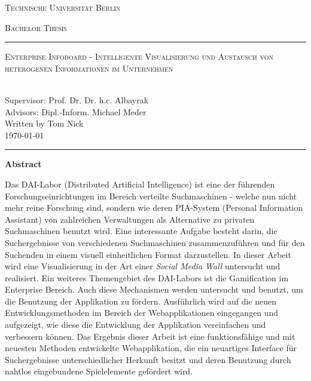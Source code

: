 \documentclass[12pt,twoside]{book}
\renewcommand{\title}{Enterprise Infoboard - Intelligente Visualisierung und Austausch von heterogenen Informationen im Unternehmen}
\renewcommand{\author}{Tom Nick}
\begin{document}
\begin{titlepage}
\begin{center}
{\Huge \textsc{Technische Universität Berlin}}
{\fontsize{2.5cm}{2cm}\selectfont \textsc{Bachelor Thesis}\par}
\vspace{1cm}
\hrule
\vspace{0.3cm}
{\Huge \textsc{\title{}}\par}
~\\[0.1cm]
{\Large Supervisor: Prof. Dr. Dr. h.c. Albayrak}\\[0.1cm]
{\Large Advisors: Dipl.-Inform. Michael Meder}\\[0.3cm]
{\Large Written by \author{}}\\[0.1cm]
{\Large \today}
\vspace{0.55cm}
\hrule
\end{center}
\vfill
\begin{center}{\Large\textbf{Abstract}}\end{center}

Das DAI-Labor (Distributed Artificial Intelligence) ist eine der führenden Forschungseinrichtungen im Bereich verteilte Suchmaschinen - welche nun nicht mehr reine Forschung sind, sondern wie deren PIA-System (Personal Information Assistant) von zahlreichen Verwaltungen als Alternative zu privaten Suchmaschinen benutzt wird. Eine interessante Aufgabe besteht darin, die Suchergebnisse von verschiedenen Suchmaschinen zusammenzuführen und für den Suchenden in einem visuell einheitlichen Format darzustellen. In dieser Arbeit wird eine Visualisierung in der Art einer \textit{Social Media Wall} untersucht und realisiert.
Ein weiteres Themengebiet des DAI-Labors ist die Gamification im Enterprise Bereich. Auch diese Mechanismen werden untersucht und benutzt, um die Benutzung der Applikation zu fördern.
Ausführlich wird auf die neuen Entwicklungsmethoden im Bereich der Webapplikationen eingegangen und aufgezeigt, wie diese die Entwicklung der Applikation vereinfachen und verbessern können.
Das Ergebnis dieser Arbeit ist eine funktionsfähige und mit neuesten Methoden entwickelte Webapplikation, die ein neuartiges Interface für Suchergebnisse unterschiedlicher Herkunft besitzt und deren Benutzung durch nahtlos eingebundene Spielelemente gefördert wird.

\end{titlepage}
\end{document}
